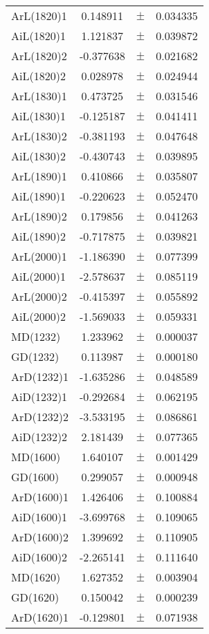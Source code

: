 \begin{table}
\begin{tiny}
\begin{tabular}{lccc}
ArL(1820)1 & 0.148911 & $\pm$ & 0.034335 \\
AiL(1820)1 & 1.121837 & $\pm$ & 0.039872 \\
ArL(1820)2 & -0.377638 & $\pm$ & 0.021682 \\
AiL(1820)2 & 0.028978 & $\pm$ & 0.024944 \\
ArL(1830)1 & 0.473725 & $\pm$ & 0.031546 \\
AiL(1830)1 & -0.125187 & $\pm$ & 0.041411 \\
ArL(1830)2 & -0.381193 & $\pm$ & 0.047648 \\
AiL(1830)2 & -0.430743 & $\pm$ & 0.039895 \\
ArL(1890)1 & 0.410866 & $\pm$ & 0.035807 \\
AiL(1890)1 & -0.220623 & $\pm$ & 0.052470 \\
ArL(1890)2 & 0.179856 & $\pm$ & 0.041263 \\
AiL(1890)2 & -0.717875 & $\pm$ & 0.039821 \\
ArL(2000)1 & -1.186390 & $\pm$ & 0.077399 \\
AiL(2000)1 & -2.578637 & $\pm$ & 0.085119 \\
ArL(2000)2 & -0.415397 & $\pm$ & 0.055892 \\
AiL(2000)2 & -1.569033 & $\pm$ & 0.059331 \\
MD(1232) & 1.233962 & $\pm$ & 0.000037 \\
GD(1232) & 0.113987 & $\pm$ & 0.000180 \\
ArD(1232)1 & -1.635286 & $\pm$ & 0.048589 \\
AiD(1232)1 & -0.292684 & $\pm$ & 0.062195 \\
ArD(1232)2 & -3.533195 & $\pm$ & 0.086861 \\
AiD(1232)2 & 2.181439 & $\pm$ & 0.077365 \\
MD(1600) & 1.640107 & $\pm$ & 0.001429 \\
GD(1600) & 0.299057 & $\pm$ & 0.000948 \\
ArD(1600)1 & 1.426406 & $\pm$ & 0.100884 \\
AiD(1600)1 & -3.699768 & $\pm$ & 0.109065 \\
ArD(1600)2 & 1.399692 & $\pm$ & 0.110905 \\
AiD(1600)2 & -2.265141 & $\pm$ & 0.111640 \\
MD(1620) & 1.627352 & $\pm$ & 0.003904 \\
GD(1620) & 0.150042 & $\pm$ & 0.000239 \\
ArD(1620)1 & -0.129801 & $\pm$ & 0.071938 \\

\end{tabular}
\end{tiny}
\end{table}
